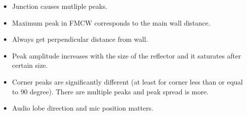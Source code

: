 \begin{itemize}
\item Junction causes mutliple peaks.
\item Maximum peak in FMCW corresponds to the main wall distance.
\item Always get perpendicular distance from wall.
\item Peak amplitude increases with the size of the reflector and it saturates after certain size.
\item Corner peaks are significantly different (at least for corner less than or equal to 90 degree). There are multiple peaks and peak spread is more.
\item Audio lobe direction and mic position matters.
\end{itemize}
